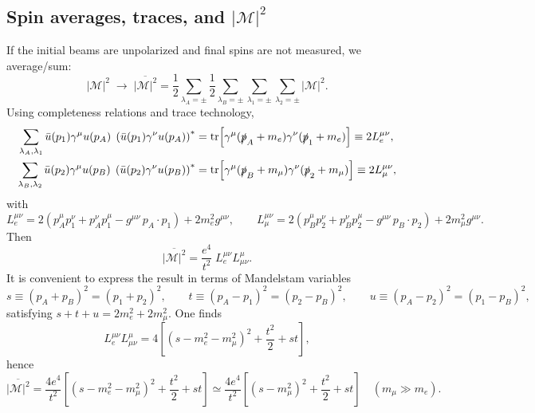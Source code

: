 \subsection{Spin averages, traces, and $|\mathcal{M}|^2$}
If the initial beams are unpolarized and final spins are not measured, we average/sum:
\begin{equation}
|\mathcal{M}|^2 \;\to\;
\overline{|\mathcal{M}|^2}
=
\frac12\sum_{\lambda_A=\pm}\frac12\sum_{\lambda_B=\pm}
\sum_{\lambda_1=\pm}\sum_{\lambda_2=\pm}
|\mathcal{M}|^2.
\end{equation}
Using completeness relations and trace technology,
\begin{align}
\sum_{\lambda_A,\lambda_1}\bar u(p_1)\gamma^\mu u(p_A)\;
\left(\bar u(p_1)\gamma^\nu u(p_A)\right)^\ast
&=
\mathrm{tr}\!\left[\gamma^\mu(\slashed{p}_A+m_e)\gamma^\nu(\slashed{p}_1+m_e)\right]
\equiv 2L^{\mu\nu}_e,\\
\sum_{\lambda_B,\lambda_2}\bar u(p_2)\gamma^\mu u(p_B)\;
\left(\bar u(p_2)\gamma^\nu u(p_B)\right)^\ast
&=
\mathrm{tr}\!\left[\gamma^\mu(\slashed{p}_B+m_\mu)\gamma^\nu(\slashed{p}_2+m_\mu)\right]
\equiv 2L^{\mu\nu}_\mu,
\end{align}
with
\begin{equation}
L^{\mu\nu}_e
=
2\left(p_A^\mu p_1^\nu + p_A^\nu p_1^\mu - g^{\mu\nu}\,p_A\!\cdot p_1\right)
+2m_e^2 g^{\mu\nu},
\qquad
L^{\mu\nu}_\mu
=
2\left(p_B^\mu p_2^\nu + p_B^\nu p_2^\mu - g^{\mu\nu}\,p_B\!\cdot p_2\right)
+2m_\mu^2 g^{\mu\nu}.
\end{equation}
Then
\begin{equation}
\overline{|\mathcal{M}|^2}
=
\frac{e^4}{t^2}\;L^{\mu\nu}_e L_{\mu\nu}^{\mu}.
\end{equation}
It is convenient to express the result in terms of Mandelstam variables
\begin{equation}
s\equiv (p_A+p_B)^2=(p_1+p_2)^2,\qquad
t\equiv (p_A-p_1)^2=(p_2-p_B)^2,\qquad
u\equiv (p_A-p_2)^2=(p_1-p_B)^2,
\end{equation}
satisfying $s+t+u=2m_e^2+2m_\mu^2$. One finds
\begin{equation}
L^{\mu\nu}_e L_{\mu\nu}^{\mu}
=
4\left[(s-m_e^2-m_\mu^2)^2+\frac{t^2}{2}+st\right],
\end{equation}
hence
\begin{equation}
\overline{|\mathcal{M}|^2}
=
\frac{4e^4}{t^2}\left[(s-m_e^2-m_\mu^2)^2+\frac{t^2}{2}+st\right]
\simeq
\frac{4e^4}{t^2}\left[(s-m_\mu^2)^2+\frac{t^2}{2}+st\right]
\quad (m_\mu\gg m_e).
\end{equation}

